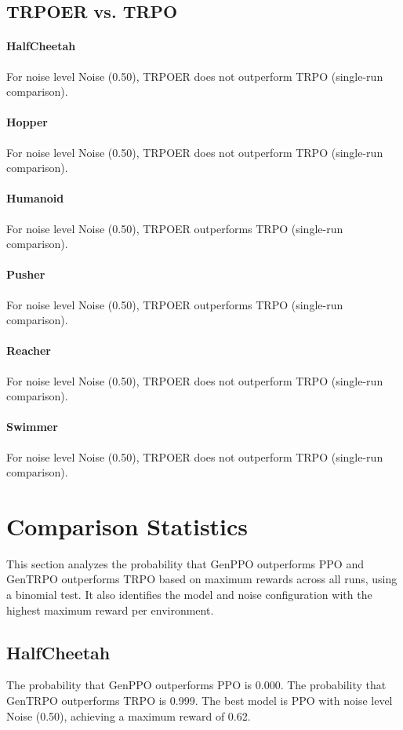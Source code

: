 \subsection{TRPOER vs. TRPO}
\paragraph{HalfCheetah}
For noise level Noise (0.50), TRPOER does not outperform TRPO (single-run comparison).
\paragraph{Hopper}
For noise level Noise (0.50), TRPOER does not outperform TRPO (single-run comparison).
\paragraph{Humanoid}
For noise level Noise (0.50), TRPOER outperforms TRPO (single-run comparison).
\paragraph{Pusher}
For noise level Noise (0.50), TRPOER outperforms TRPO (single-run comparison).
\paragraph{Reacher}
For noise level Noise (0.50), TRPOER does not outperform TRPO (single-run comparison).
\paragraph{Swimmer}
For noise level Noise (0.50), TRPOER does not outperform TRPO (single-run comparison).
\section{Comparison Statistics}
This section analyzes the probability that GenPPO outperforms PPO and GenTRPO outperforms TRPO based on maximum rewards across all runs, using a binomial test. It also identifies the model and noise configuration with the highest maximum reward per environment.
\subsection{HalfCheetah}
The probability that GenPPO outperforms PPO is 0.000.
The probability that GenTRPO outperforms TRPO is 0.999.
The best model is PPO with noise level Noise (0.50), achieving a maximum reward of 0.62.
